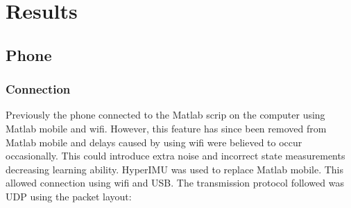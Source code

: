 \documentclass[twoside,twocolumn,12pt]{article}
\begin{document}

\clearpage
\section{Results}
\subsection{Phone}
\subsubsection{Connection}
Previously the phone connected to the Matlab scrip on the computer using Matlab mobile and wifi. However, this feature has since been removed from Matlab mobile and delays caused by using wifi were believed to occur occasionally. This could introduce extra noise and incorrect state measurements decreasing learning ability.
\newline
HyperIMU \cite{ianovir} was used to replace Matlab mobile. This allowed connection using wifi and USB. The transmission protocol followed was UDP using the packet layout:
\end{document}
